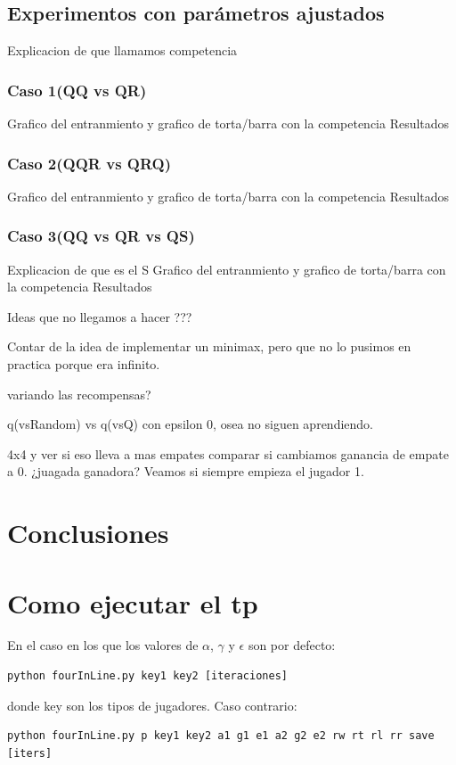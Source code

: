 \documentclass[10pt, a4paper]{article}
\begin{document}
\restoregeometry


\subsection{Experimentos con parámetros ajustados}

Explicacion de que llamamos competencia

\subsubsection{Caso 1(QQ vs QR)}

Grafico del entranmiento y grafico de torta/barra con la competencia Resultados

\subsubsection{Caso 2(QQR vs QRQ)}

Grafico del entranmiento y grafico de torta/barra con la competencia Resultados

\subsubsection{Caso 3(QQ vs QR vs QS)}

Explicacion de que es el S Grafico del entranmiento y grafico de torta/barra con la competencia Resultados


Ideas que no llegamos a hacer ???

Contar de la idea de implementar un minimax, pero que no lo pusimos en practica porque era infinito.

variando las recompensas?

q(vsRandom) vs q(vsQ) con epsilon 0, osea no siguen aprendiendo.


4x4 y ver si eso lleva a  mas empates
comparar si cambiamos ganancia de empate a 0.
¿juagada ganadora? Veamos si siempre empieza el jugador 1.






\section{Conclusiones}

\section{Como ejecutar el tp}



En el caso en los que los valores de $\alpha$, $\gamma$ y $\epsilon$ son por defecto:
\begin{lstlisting}
python fourInLine.py key1 key2 [iteraciones]  
\end{lstlisting}
donde key son los tipos de jugadores. Caso contrario: \\
\begin{lstlisting}
python fourInLine.py p key1 key2 a1 g1 e1 a2 g2 e2 rw rt rl rr save [iters]
\end{lstlisting}
\end{document}
